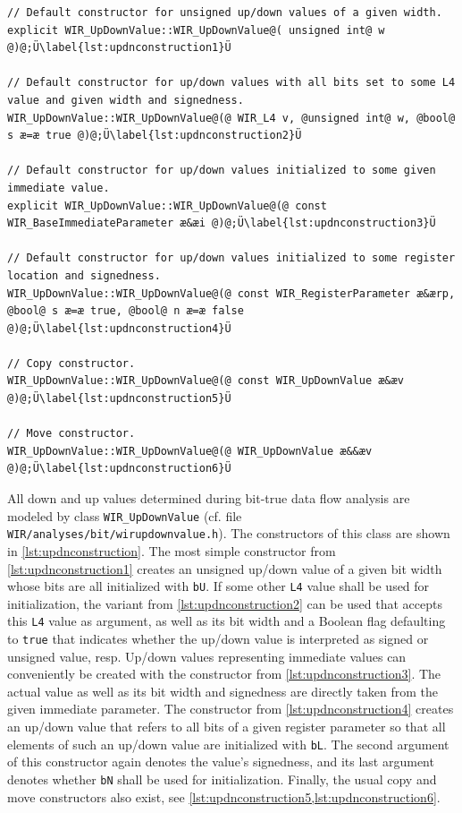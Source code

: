 \begin{lstlisting}[style=code,float=!b,caption={Constructors of Class \texttt{WIR\_UpDownValue}},label=lst:updnconstruction]
// Default constructor for unsigned up/down values of a given width.
explicit WIR_UpDownValue::WIR_UpDownValue@( unsigned int@ w @)@;Ü\label{lst:updnconstruction1}Ü

// Default constructor for up/down values with all bits set to some L4 value and given width and signedness.
WIR_UpDownValue::WIR_UpDownValue@(@ WIR_L4 v, @unsigned int@ w, @bool@ s æ=æ true @)@;Ü\label{lst:updnconstruction2}Ü

// Default constructor for up/down values initialized to some given immediate value.
explicit WIR_UpDownValue::WIR_UpDownValue@(@ const WIR_BaseImmediateParameter æ&æi @)@;Ü\label{lst:updnconstruction3}Ü

// Default constructor for up/down values initialized to some register location and signedness.
WIR_UpDownValue::WIR_UpDownValue@(@ const WIR_RegisterParameter æ&ærp, @bool@ s æ=æ true, @bool@ n æ=æ false @)@;Ü\label{lst:updnconstruction4}Ü

// Copy constructor.
WIR_UpDownValue::WIR_UpDownValue@(@ const WIR_UpDownValue æ&æv @)@;Ü\label{lst:updnconstruction5}Ü

// Move constructor.
WIR_UpDownValue::WIR_UpDownValue@(@ WIR_UpDownValue æ&&æv @)@;Ü\label{lst:updnconstruction6}Ü
\end{lstlisting}

All down and up values determined during bit-true data flow analysis are modeled by class \texttt{WIR\_UpDownValue} (cf. file \texttt{WIR/analyses/bit/wirupdownvalue.h}).
The constructors of this class are shown in \cref{lst:updnconstruction}.
The most simple constructor from \cref{lst:updnconstruction1} creates an unsigned up/down value of a given bit width whose bits are all initialized with \texttt{bU}.
If some other \texttt{L4} value shall be used for initialization, the variant from \cref{lst:updnconstruction2} can be used that accepts this \texttt{L4} value as argument, as well as its bit width and a Boolean flag defaulting to \texttt{true} that indicates whether the up/down value is interpreted as signed or unsigned value, resp.
Up/down values representing immediate values can conveniently be created with the constructor from \cref{lst:updnconstruction3}.
The actual value as well as its bit width and signedness are directly taken from the given immediate parameter.
The constructor from \cref{lst:updnconstruction4} creates an up/down value that refers to all bits of a given register parameter so that all elements of such an up/down value are initialized with \texttt{bL}.
The second argument of this constructor again denotes the value's signedness, and its last argument denotes whether \texttt{bN} shall be used for initialization.
Finally, the usual copy and move constructors also exist, see \cref{lst:updnconstruction5,lst:updnconstruction6}.

